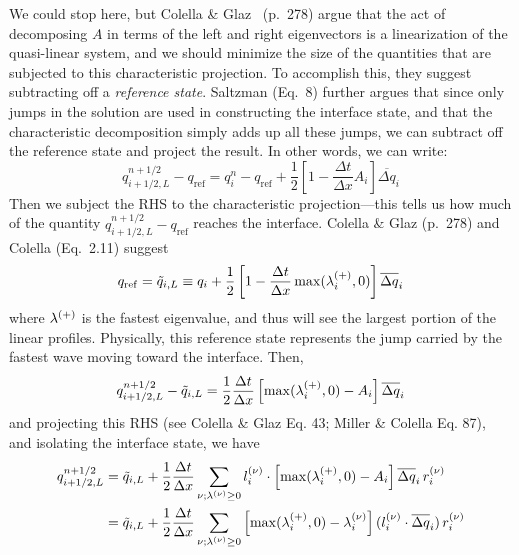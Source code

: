 We could stop here, but Colella \& Glaz~\cite{colellaglaz:1985}
(p.\ 278) argue that the act of decomposing $A$ in terms of the left
and right eigenvectors is a linearization of the quasi-linear system,
and we should minimize the size of the quantities that are subjected
to this characteristic projection.  To accomplish this, they suggest
subtracting off a {\em reference state}.  Saltzman (Eq.\ 8) further
argues that since only jumps in the solution are used in constructing
the interface state, and that the characteristic decomposition simply adds
up all these jumps, we can subtract off the reference state and
project the result.  In other words, we can write:
\begin{equation}
q_{i+1/2,L}^{n+1/2} - q_\mathrm{ref} = q_i^n - q_\mathrm{ref} +  
  \frac{1}{2} \left [ 1 - \frac{\Delta t}{\Delta x} A_i \right ] \overline{\Delta q}_i
\label{eq:lin_decomp}
\end{equation}
Then we subject the RHS to the characteristic projection---this tells
us how much of the quantity $q_{i+1/2,L}^{n+1/2} - q_\mathrm{ref}$
reaches the interface.  Colella \& Glaz (p.\ 278) and Colella
(Eq.\ 2.11) suggest
\begin{equation}
q_\mathrm{ref} = \tilde{q}_{i,L} \equiv q_i + 
   \frac{1}{2} \left [ 1 - \frac{\Delta t}{\Delta x}
 \max(\lambda_i^{(+)}, 0) \right ] \overline{\Delta q}_i \label{eq:qref}
\end{equation}
where $\lambda^{(+)}$ is the fastest eigenvalue, and thus will see
the largest portion of the linear profiles.  Physically, this
reference state represents the jump carried by the fastest wave
moving toward the interface.  Then,
\begin{equation}
q_{i+1/2,L}^{n+1/2} - \tilde{q}_{i,L} = \frac{1}{2} \frac{\Delta t}{\Delta x}
  \left [ \max(\lambda_i^{(+)},0) - A_i \right ] \overline{\Delta q}_i
\end{equation}
and projecting this RHS (see Colella \& Glaz Eq. 43; Miller \& Colella Eq. 87),
and isolating the interface state, we have
\begin{align}
q_{i+1/2,L}^{n+1/2} &= \tilde{q}_{i,L} + \frac{1}{2} \frac{\Delta t}{\Delta x}
       \sum_{\nu; \lambda^{(\nu)} \ge 0} l_i^{(\nu)} \cdot \left [ \max(\lambda_i^{(+)},0) - A_i \right ]
                                           \overline{\Delta q}_i \, r_i^{(\nu)} \\
                    &= \tilde{q}_{i,L} + \frac{1}{2} \frac{\Delta t}{\Delta x}
       \sum_{\nu; \lambda^{(\nu)} \ge 0} \left [ \max(\lambda_i^{(+)},0) - \lambda_i^{(\nu)} \right ]
                                          (l_i^{(\nu)} \cdot \overline{\Delta q}_i) \, r_i^{(\nu)}
\end{align}
